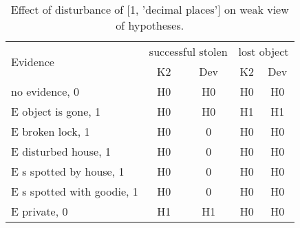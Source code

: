 \begin{table}\begin{tabular}{l|cc|cc}\toprule\multirow{2}{*}{Evidence} & \multicolumn{2}{c}{successful stolen}& \multicolumn{2}{c}{lost object}\\& {K2} & {Dev}& {K2} & {Dev}\\\midrule
no evidence, 0 & H0&H0&H0&H0\\E object is gone, 1 & H0&H0&H1&H1\\E broken lock, 1 & \cellcolor{Bittersweet}H0&\cellcolor{Bittersweet}0&H0&H0\\E disturbed house, 1 & \cellcolor{Bittersweet}H0&\cellcolor{Bittersweet}0&H0&H0\\E s spotted by house, 1 & \cellcolor{Bittersweet}H0&\cellcolor{Bittersweet}0&H0&H0\\E s spotted with goodie, 1 & \cellcolor{Bittersweet}H0&\cellcolor{Bittersweet}0&H0&H0\\E private, 0 & H1&H1&H0&H0\\\bottomrule\end{tabular}\caption{Effect of disturbance of [1, 'decimal places'] on weak view of hypotheses.}\end{table}